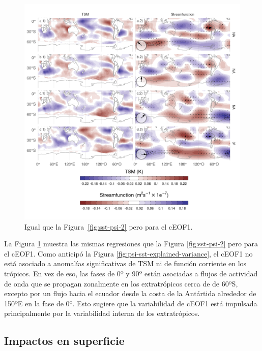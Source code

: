 \documentclass[12pt,oneside,a4paper]{reedthesis}
\begin{document}
\begin{figure}

{\centering \includegraphics{figures/20-ceofs/sst-psi-1-1} 

}

\caption{Igual que la Figura~\ref{fig:sst-psi-2} pero para el cEOF1.}\label{fig:sst-psi-1}
\end{figure}

La Figura \ref{fig:sst-psi-1} muestra las mismas regresiones que la Figura \ref{fig:sst-psi-2} pero para el cEOF1.
Como anticipó la Figura \ref{fig:psi-sst-explained-variance}, el cEOF1 no está asociado a anomalías significativas de TSM ni de función corriente en los trópicos.
En vez de eso, las fases de 0º y 90º están asociadas a flujos de actividad de onda que se propagan zonalmente en los extratrópicos cerca de de 60ºS, excepto por un flujo hacia el ecuador desde la costa de la Antártida alrededor de 150ºE en la fase de 0º.
Esto sugiere que la variabilidad de cEOF1 está impulsada principalmente por la variabilidad interna de los extratrópicos.

\hypertarget{impactos}{%
\subsection{Impactos en superficie}\label{impactos}}
\end{document}
